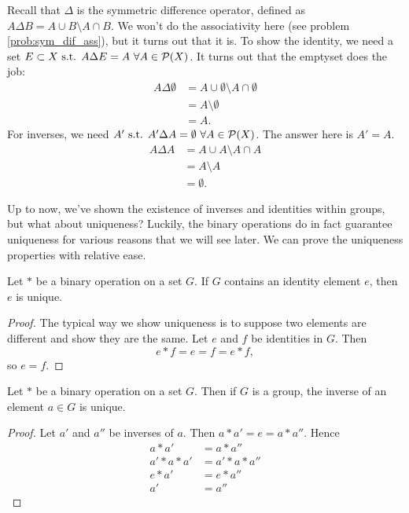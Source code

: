 \begin{example}{}
    Recall that $\Delta$ is the symmetric difference operator, defined as $A\Delta B= A\cup B\setminus A\cap B$. We won't do the associativity here (see problem \ref{prob:sym_dif_ass}), but it turns out that it is. To show the identity, we need a set $E\subset X \text{ s.t. } A\Delta E=A\ \forall A\in\mathcal{P}(X)$. It turns out that the emptyset does the job:
    \begin{align*}
        A\Delta \emptyset &= A\cup\emptyset \setminus A\cap\emptyset\\
        &= A \setminus \emptyset\\
        &= A.
    \end{align*}
    For inverses, we need $A'\text{ s.t. } A'\Delta A=\emptyset\ \forall A\in\mathcal{P}(X)$. The answer here is $A'=A$.
    \begin{align*}
        A \Delta A &= A \cup A \setminus A\cap A\\
        &= A \setminus A\\
        &= \emptyset.
    \end{align*}
\end{example}

Up to now, we've shown the existence of inverses and identities within groups, but what about uniqueness?
Luckily, the binary operations do in fact guarantee uniqueness for various reasons that we will see later.
We can prove the uniqueness properties with relative ease.

\begin{theorem}{}
	Let $*$ be a binary operation on a set $G$. If $G$ contains an identity element $e$, then $e$ is unique.
\end{theorem}
\begin{proof}
	The typical way we show uniqueness is to suppose two elements are different and show they are the same. Let $e$ and $f$ be identities in $G$. Then
	\[
		e*f=e=f=e*f,
	\]
	so $e=f$.
\end{proof}
\begin{theorem}{}\label{thm:inv_unique}
	Let $*$ be a binary operation on a set $G$. Then if $G$ is a group, the inverse of an element $a\in G$ is unique.
\end{theorem}
\begin{proof}
	Let $a'$ and $a''$ be inverses of $a$. Then $a*a'=e=a*a''$. Hence
	\begin{align*}
		a*a' &= a*a''\\
		a'*a*a' &= a'*a*a''\\
		e*a' &= e*a''\\
		a' &= a''
	\end{align*}
\end{proof}

